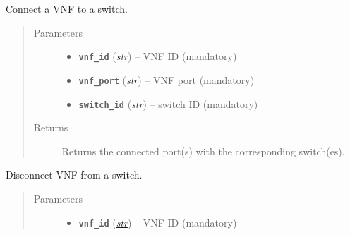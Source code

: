 \documentclass[letterpaper,10pt,english]{sphinxmanual}
\begin{document}
\begin{fulllineitems}
\begin{fulllineitems}
\end{fulllineitems}


\begin{fulllineitems}
\label{util/adapter:escape.util.adapter.VNFStarterAPI.connectVNF}
Connect a VNF to a switch.
\begin{quote}\begin{description}
\item[{Parameters}] \leavevmode\begin{itemize}
\item {} 
\textbf{\texttt{vnf\_id}} (\href{https://docs.python.org/2.7/library/functions.html\#str}{\emph{str}}) -- VNF ID (mandatory)

\item {} 
\textbf{\texttt{vnf\_port}} (\href{https://docs.python.org/2.7/library/functions.html\#str}{\emph{str}}) -- VNF port (mandatory)

\item {} 
\textbf{\texttt{switch\_id}} (\href{https://docs.python.org/2.7/library/functions.html\#str}{\emph{str}}) -- switch ID (mandatory)

\end{itemize}

\item[{Returns}] \leavevmode
Returns the connected port(s) with the corresponding switch(es).

\end{description}\end{quote}

\end{fulllineitems}


\begin{fulllineitems}
\label{util/adapter:escape.util.adapter.VNFStarterAPI.disconnectVNF}
Disconnect VNF from a switch.
\begin{quote}\begin{description}
\item[{Parameters}] \leavevmode\begin{itemize}
\item {} 
\textbf{\texttt{vnf\_id}} (\href{https://docs.python.org/2.7/library/functions.html\#str}{\emph{str}}) -- VNF ID (mandatory)


\end{itemize}
\end{description}
\end{quote}
\end{fulllineitems}
\end{fulllineitems}
\end{document}
